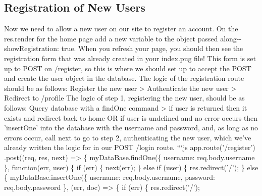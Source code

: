 \documentclass{article}%
\begin{document}
\subsection{Registration of New Users}%
\label{subsec:RegistrationofNewUsers}%
Now we need to allow a new user on our site to register an account. On the res.render for the home page add a new variable to the object passed along{-}{-}showRegistration: true. When you refresh your page, you should then see the registration form that was already created in your index.pug file! This form is set up to POST on /register, so this is where we should set up to accept the POST and create the user object in the database.\newline%
The logic of the registration route should be as follows: Register the new user > Authenticate the new user > Redirect to /profile\newline%
The logic of step 1, registering the new user, should be as follows: Query database with a findOne command > if user is returned then it exists and redirect back to home OR if user is undefined and no error occurs then 'insertOne' into the database with the username and password, and, as long as no errors occur, call next to go to step 2, authenticating the new user, which we've already written the logic for in our POST /login route.\newline%
```js\newline%
app.route('/register')\newline%
  .post((req, res, next) => \{\newline%
    myDataBase.findOne(\{ username: req.body.username \}, function(err, user) \{\newline%
      if (err) \{\newline%
        next(err);\newline%
      \} else if (user) \{\newline%
        res.redirect('/');\newline%
      \} else \{\newline%
        myDataBase.insertOne(\{\newline%
          username: req.body.username,\newline%
          password: req.body.password\newline%
        \},\newline%
          (err, doc) => \{\newline%
            if (err) \{\newline%
              res.redirect('/');\newline%
\end{document}
